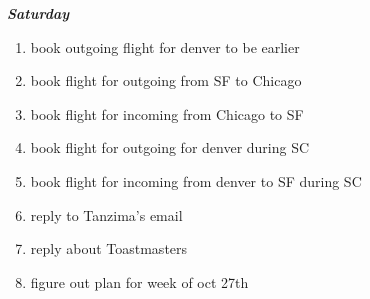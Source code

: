 \documentclass[11pt]{article}
\begin{document}
\textbf{\textit{Saturday}}
\begin{enumerate}
\item book outgoing flight for denver to be earlier
\item book flight for outgoing from SF to Chicago
\item book flight for incoming from Chicago to SF
\item book flight for outgoing for denver during SC
\item book flight for incoming from denver to SF during SC
\item reply to Tanzima's email
\item reply about Toastmasters
\item figure out plan for week of oct 27th


\end{enumerate}

\newpage
\end{document}
